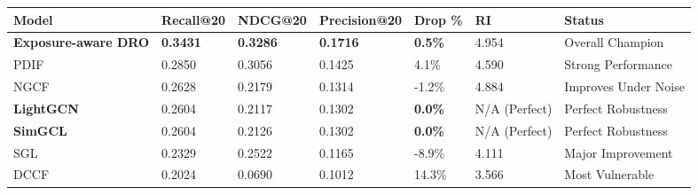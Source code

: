 \begin{tabular}{lllllll}
\toprule
Model & Recall@20 & NDCG@20 & Precision@20 & Drop \% & RI & Status \\
\midrule
\textbf{Exposure-aware DRO} & \textbf{0.3431} & \textbf{0.3286} & \textbf{0.1716} & \textbf{0.5\%} & 4.954 & Overall Champion \\
PDIF & 0.2850 & 0.3056 & 0.1425 & 4.1\% & 4.590 & Strong Performance \\
NGCF & 0.2628 & 0.2179 & 0.1314 & -1.2\% & 4.884 & Improves Under Noise \\
\textbf{LightGCN} & 0.2604 & 0.2117 & 0.1302 & \textbf{0.0\%} & N/A (Perfect) & Perfect Robustness \\
\textbf{SimGCL} & 0.2604 & 0.2126 & 0.1302 & \textbf{0.0\%} & N/A (Perfect) & Perfect Robustness \\
SGL & 0.2329 & 0.2522 & 0.1165 & -8.9\% & 4.111 & Major Improvement \\
DCCF & 0.2024 & 0.0690 & 0.1012 & 14.3\% & 3.566 & Most Vulnerable \\
\bottomrule
\end{tabular}
